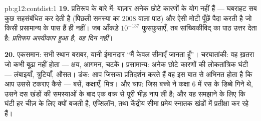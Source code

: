 \begin{solution}{pb:g12:contdist:1}
\textbf{19.} प्रतिरूप के बारे में: बाज़ार अनेक \emph{} छोटे कारणों के
योग नहीं हैं --- घबराहट सब कुछ सहसंबंधित कर देती है (पिछली समस्या का 2008 वाला
पाठ) और ऐसी मोटी पूँछें पैदा करती है जो किसी प्रसामान्य  के पास हैं ही
नहीं। जब आँकड़े $10^{-137}$ फुसफुसाएँ, तब सांख्यिकीविद् का पाठ उत्तर देता है:
\emph{प्रतिरूप अस्वीकार हुआ है, वह दिन नहीं}।

\textbf{20.} एकसमान: सभी स्थान बराबर, यानी ईमानदार ``मैं केवल सीमाएँ जानता
हूँ''। चरघातांकी: वह ख़तरा जो कभी बूढ़ा नहीं होता --- क्षय, आगमन, चटकें।
प्रसामान्य: अनेक छोटे  कारणों की लोकतांत्रिक घंटी --- लंबाइयाँ,
त्रुटियाँ, औसत। डंक: आप जिसका प्रतिदर्शन करते हैं वह इस बात से अभिनत होता है
कि आप उससे टकराए कैसे --- बसें, कक्षाएँ, मित्र। और चाप: जिस बच्चे ने कक्षा 6
में रस के डिब्बे गिने थे, उसने दस खंडों की समस्याओं के बाद एक वक्र से पूरी भीड़
नाप ली है; और यह समझाने के लिए कि घंटी हर चीज़ के लिए क्यों बजती है, एप्सिलॉन,
 तथा केंद्रीय सीमा प्रमेय स्नातक खंडों में प्रतीक्षा कर रहे हैं।
\end{solution}
